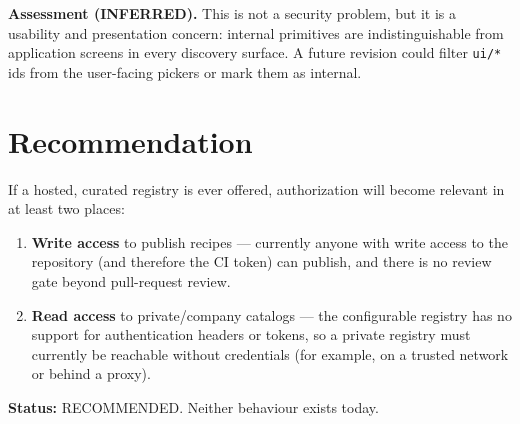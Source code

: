 \textbf{Assessment (INFERRED).} This is not a security problem, but it is a
usability and presentation concern: internal primitives are indistinguishable from
application screens in every discovery surface. A future revision could filter
\texttt{ui/*} ids from the user-facing pickers or mark them as internal.

\section{Recommendation}

If a hosted, curated registry is ever offered, authorization will become relevant
in at least two places:

\begin{enumerate}
  \item \textbf{Write access} to publish recipes --- currently anyone with write
        access to the repository (and therefore the CI token) can publish, and
        there is no review gate beyond pull-request review.
  \item \textbf{Read access} to private/company catalogs --- the configurable
        registry has no support for authentication headers or tokens, so a private
        registry must currently be reachable without credentials (for example, on a
        trusted network or behind a proxy).
\end{enumerate}

\textbf{Status:} RECOMMENDED. Neither behaviour exists today.
